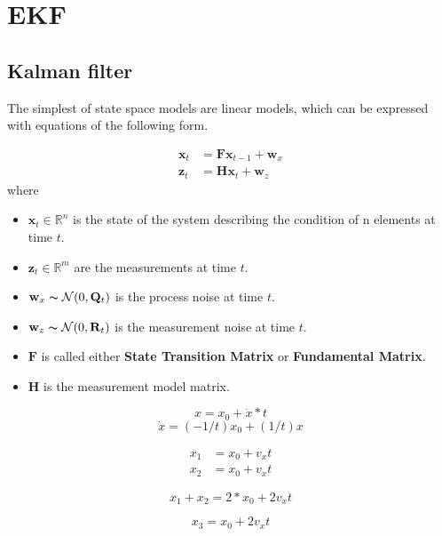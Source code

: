 \documentclass[oneside, 12pt, a4paper]{book}
\begin{document}
\chapter{EKF}

\section{Kalman filter}
The simplest of state space models are linear models, which can be expressed with equations of the following form.

\begin{equation}
    \begin{split}
        \mathbf{x}_t &= \mathbf{F}\mathbf{x}_{t-1}+\mathbf{w}_x\\
        \mathbf{z}_t &= \mathbf{H}\mathbf{x}_t+\mathbf{w}_z
     \end{split}
\end{equation}
where
\begin{itemize}
    \item $\mathbf{x}_t \in \mathbb{R}^n$ is the state of the system describing the condition of n elements at time $t$. 
    \item $\mathbf{z}_t \in \mathbb{R}^m$ are the measurements at time $t$.
    \item $\mathbf{w}_x \thicksim \mathcal{N}(0,\mathbf{Q}_t)$ is the process noise at time $t$.
    \item $\mathbf{w}_z \thicksim \mathcal{N}(0,\mathbf{R}_t)$ is the measurement noise at time $t$.
    \item $\mathbf{F}$ is called either \textbf{State Transition Matrix} or \textbf{Fundamental Matrix}.
    \item $\mathbf{H}$ is the measurement model matrix.
\end{itemize}

\begin{equation}
    x = x_0 + \dot{x}*t
\end{equation}
\begin{equation}
    \dot{x} = (-1/t)x_0 + (1/t)x
\end{equation}

\begin{equation}
    \begin{split}
        x_1 &= x_0 + v_x t \\
        x_2 &= x_0 + v_x t
    \end{split}
\end{equation}

\begin{equation}
    x_1 + x_2 = 2*x_0 + 2v_x t 
\end{equation}

\begin{equation}
    x_3 = x_0 + 2v_x t
\end{equation}
\end{document}
